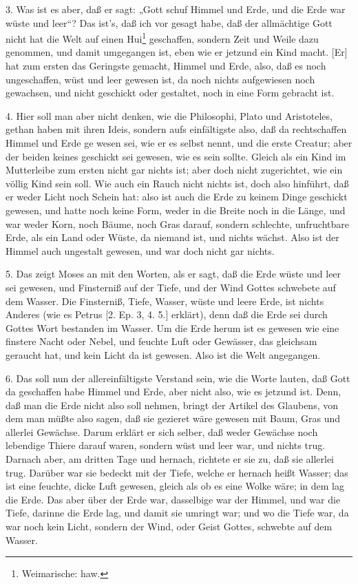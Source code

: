 3. Was ist es aber, daß er sagt: „Gott schuf Himmel und Erde, und die Erde war wüste und leer“? Das ist’s, daß ich vor gesagt habe, daß der allmächtige Gott nicht hat die Welt auf einen Hui\footnote{Weimarische: haw.} geschaffen, sondern Zeit und Weile dazu genommen, und damit umgegangen ist, eben wie er jetzund ein Kind macht. [Er] hat zum ersten das Geringste gemacht, Himmel und Erde, also, daß es noch ungeschaffen, wüst und leer gewesen ist, da noch nichts aufgewiesen noch gewachsen, und nicht geschickt oder gestaltet, noch in eine Form gebracht ist.

4. Hier soll man aber nicht denken, wie die Philosophi, Plato und Aristoteles, gethan haben mit ihren Ideis, sondern aufs einfältigste also, daß da rechtschaffen Himmel und Erde ge
wesen sei, wie er es selbst nennt, und die erste Creatur; aber der beiden keines geschickt sei gewesen, wie es sein sollte. Gleich als ein Kind im Mutterleibe zum ersten nicht gar nichts ist; aber doch nicht zugerichtet, wie ein völlig Kind sein soll. Wie auch ein Rauch nicht nichts ist, doch also hinführt, daß er weder Licht noch Schein hat: also ist auch die Erde zu keinem Dinge geschickt gewesen, und hatte noch keine Form, weder in die Breite noch in die Länge, und war weder Korn, noch Bäume, noch Gras darauf, sondern schlechte, unfruchtbare Erde, als ein Land oder Wüste, da niemand ist, und nichts wächst. Also ist der Himmel auch ungestalt gewesen, und war doch nicht gar nichts.

5. Das zeigt Moses an mit den Worten, als er sagt, daß die Erde wüste und leer sei gewesen, und Finsterniß auf der Tiefe, und der Wind Gottes schwebete auf dem Wasser. Die Finsterniß, Tiefe, Wasser, wüste und leere Erde, ist nichts Anderes (wie es Petrus [2. Ep. 3, 4. 5.] erklärt), denn daß die Erde sei durch Gottes Wort bestanden im Wasser. Um die Erde herum ist es gewesen wie eine finstere Nacht oder Nebel, und feuchte Luft oder Gewässer, das gleichsam geraucht hat, und kein Licht da ist gewesen. Also ist die Welt angegangen.

6. Das soll nun der allereinfältigste Verstand sein, wie die Worte lauten, daß Gott da geschaffen habe Himmel und Erde, aber nicht also, wie es jetzund ist. Denn, daß man die Erde nicht also soll nehmen, bringt der Artikel des Glaubens, von dem man müßte also sagen, daß sie gezieret wäre gewesen mit Baum, Gras und allerlei Gewächse. Darum erklärt er sich selber, daß weder Gewächse noch lebendige Thiere darauf waren, sondern wüst und leer war, und nichts trug. Darnach aber, am dritten Tage und hernach, richtete er sie zu, daß sie allerlei trug. Darüber war sie bedeckt mit der Tiefe, welche er hernach heißt Wasser; das ist eine feuchte, dicke Luft gewesen, gleich als ob es eine Wolke wäre; in dem lag die Erde. Das aber über der Erde war, dasselbige war der Himmel, und war die Tiefe, darinne die Erde lag, und damit sie umringt war; und wo die Tiefe war, da war noch kein Licht, sondern der Wind, oder Geist Gottes, schwebte auf dem Wasser.

